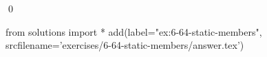 
\begin{ex}
  \label{ex:6-64-static-members}
  
  \qed
\end{ex}
\begin{python0}
from solutions import *
add(label="ex:6-64-static-members",
    srcfilename='exercises/6-64-static-members/answer.tex')
\end{python0}
